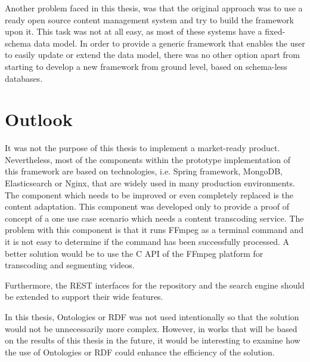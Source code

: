 Another problem faced in this thesis, was that the original approach was to use a ready open source content management system and try to build the framework upon it. This task was not at all easy, as most of these systems have a fixed-schema data model. In order to provide a generic framework that enables the user to easily update or extend the data model, there was no other option apart from starting to develop a new framework from ground level, based on schema-less databases. 

\section{Outlook}
It was not the purpose of this thesis to implement a market-ready product. Nevertheless, most of the components within the prototype implementation of this framework are based on technologies, i.e. Spring framework, MongoDB, Elasticsearch or Nginx, that are widely used in many production environments. The component which needs to be improved or even completely replaced is the content adaptation. This component was developed only to provide a proof of concept of a one use case scenario which needs a content transcoding service. The problem with this component is that it runs FFmpeg as a terminal command and it is not easy to determine if the command has been successfully processed. A better solution would be to use the C API of the FFmpeg platform for transcoding and segmenting videos.

Furthermore, the REST interfaces for the repository and the search engine should be extended to support their wide features.

In this thesis, Ontologies or RDF was not used intentionally so that the solution would not be unnecessarily more complex. However, in works that will be based on the results of this thesis in the future, it would be interesting to examine how the use of Ontologies or RDF could enhance the efficiency of the solution.